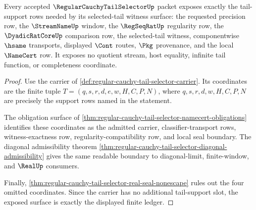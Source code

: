 \begin{theorem}
\label{thm:regular-cauchy-tail-selector-tail-support-coverage}
Every accepted $\RegularCauchyTailSelectorUp$ packet exposes exactly the tail-support rows needed by its selected-tail witness surface: the requested precision row, the $\StreamNameUp$ window, the $\RegSeqRatUp$ regularity row, the $\DyadicRatCoreUp$ comparison row, the selected-tail witness, componentwise $\hsame$ transports, displayed $\Cont$ routes, $\Pkg$ provenance, and the local $\NameCert$ row. It exposes no quotient stream, host equality, infinite tail function, or completeness coordinate.
\end{theorem}
\begin{proof}
Use the carrier of \autoref{def:regular-cauchy-tail-selector-carrier}. Its coordinates are the finite tuple $T=(q,s,r,d,e,w,H,C,P,N)$, where $q,s,r,d,w,H,C,P,N$ are precisely the support rows named in the statement.

The obligation surface of \autoref{thm:regular-cauchy-tail-selector-namecert-obligations} identifies these coordinates as the admitted carrier, classifier-transport rows, witness-exactness row, regularity-compatibility row, and local seal boundary. The diagonal admissibility theorem \autoref{thm:regular-cauchy-tail-selector-diagonal-admissibility} gives the same readable boundary to diagonal-limit, finite-window, and $\RealUp$ consumers.

Finally, \autoref{thm:regular-cauchy-tail-selector-real-seal-nonescape} rules out the four omitted coordinates. Since the carrier has no additional tail-support slot, the exposed surface is exactly the displayed finite ledger.
\end{proof}

